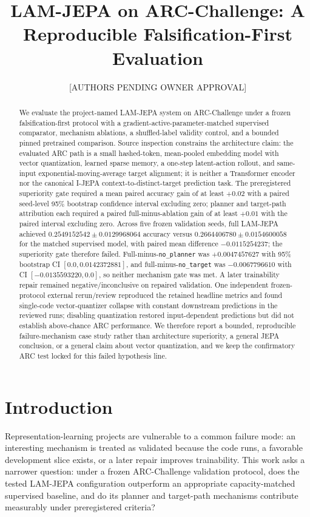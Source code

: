 \documentclass[11pt]{article}
\title{LAM-JEPA on ARC-Challenge: A Reproducible Falsification-First Evaluation}
\author{[AUTHORS PENDING OWNER APPROVAL]}
\date{}
\begin{document}
\maketitle

\begin{abstract}
We evaluate the project-named LAM-JEPA system on ARC-Challenge under a frozen falsification-first protocol with a gradient-active-parameter-matched supervised comparator, mechanism ablations, a shuffled-label validity control, and a bounded pinned pretrained comparison. Source inspection constrains the architecture claim: the evaluated ARC path is a small hashed-token, mean-pooled embedding model with vector quantization, learned sparse memory, a one-step latent-action rollout, and same-input exponential-moving-average target alignment; it is neither a Transformer encoder nor the canonical I-JEPA context-to-distinct-target prediction task. The preregistered superiority gate required a mean paired accuracy gain of at least $+0.02$ with a paired seed-level 95\% bootstrap confidence interval excluding zero; planner and target-path attribution each required a paired full-minus-ablation gain of at least $+0.01$ with the paired interval excluding zero. Across five frozen validation seeds, full LAM-JEPA achieved $0.2549152542 \pm 0.0129968064$ accuracy versus $0.2664406780 \pm 0.0154600058$ for the matched supervised model, with paired mean difference $-0.0115254237$; the superiority gate therefore failed. Full-minus-\texttt{no\_planner} was $+0.0047457627$ with 95\% bootstrap CI $[0.0, 0.0142372881]$, and full-minus-\texttt{no\_target} was $-0.0067796610$ with CI $[-0.0135593220, 0.0]$, so neither mechanism gate was met. A later trainability repair remained negative/inconclusive on repaired validation. One independent frozen-protocol external rerun/review reproduced the retained headline metrics and found single-code vector-quantizer collapse with constant downstream predictions in the reviewed runs; disabling quantization restored input-dependent predictions but did not establish above-chance ARC performance. We therefore report a bounded, reproducible failure-mechanism case study rather than architecture superiority, a general JEPA conclusion, or a general claim about vector quantization, and we keep the confirmatory ARC test locked for this failed hypothesis line.
\end{abstract}

\section{Introduction}
Representation-learning projects are vulnerable to a common failure mode: an interesting mechanism is treated as validated because the code runs, a favorable development slice exists, or a later repair improves trainability. This work asks a narrower question: under a frozen ARC-Challenge validation protocol, does the tested LAM-JEPA configuration outperform an appropriate capacity-matched supervised baseline, and do its planner and target-path mechanisms contribute measurably under preregistered criteria?
\end{document}
